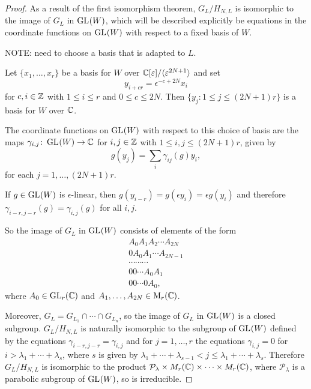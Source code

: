 \documentclass[a4paper, 11pt]{report}
\begin{document}
\begin{proof}
As a result of the first isomorphism theorem, $G_L/{H_{N,L}}$ is isomorphic to the image of $G_L$ in $\operatorname{GL}_{}(W)$, which will be described explicitly be equations in the coordinate functions on $\operatorname{GL}_{}(W)$ with respect to a fixed basis of $W$.

NOTE: need to choose a basis that is adapted to $L$.

Let $\{x_1,\ldots,x_r\}$ be a basis for $W$ over $\mathbb{C}[\varepsilon]/{\langle\varepsilon^{2N+1}\rangle}$ and set
\begin{equation*}
y_{i+cr} = \epsilon^{-c+2N} x_i
\end{equation*}
for $c,i\in\mathbb{Z}$ with $1\le i\le r$ and $0\le c\le 2N$. Then $\{y_j:1\le j\le (2N+1)r\}$ is a basis for $W$ over $\mathbb{C}$.

The coordinate functions on $\operatorname{GL}_{}(W)$ with respect to this choice of basis are
the maps $\gamma_{i,j}\colon\operatorname{GL}_{}(W)\to\mathbb{C}$ for $i,j\in\mathbb{Z}$ with $1\le i,j\le (2N+1)r$, given by
\begin{equation*}
g(y_j) = \sum_i \gamma_{ij}(g)y_i,
\end{equation*}
for each $j=1,\ldots,(2N+1)r$.

If $g\in\operatorname{GL}_{}(W)$ is $\epsilon$-linear, then $g(y_{i-r}) = g(\epsilon y_i) = \epsilon g(y_i)$ and therefore $\gamma_{i-r,j-r}(g) = \gamma_{i,j}(g)$ for all $i,j$.

So the image of $G_L$ in $\operatorname{GL}_{}(W)$ consists of elements of the form
\begin{align*}
A_0 A_1 A_2 \cdots A_{2N}\\
0 A_0 A_1 \cdots A_{2N-1}\\
\cdots \cdots \cdots\\
0 0 \cdots A_0 A_1\\
0 0 \cdots 0 A_0,
\end{align*}
where $A_0\in\operatorname{GL}_{r}(\mathbb{C})$ and $A_1,\ldots,A_{2N}\in\operatorname{M}_{r}(\mathbb{C})$.

{\color{gray}
Moreover, $G_L = G_{L_1}\cap\cdots\cap G_{L_n}$, so the image of $G_L$ in $\operatorname{GL}_{}(W)$ is a closed subgroup. $G_L/{H_{N,L}}$ is naturally isomorphic to the subgroup of $\operatorname{GL}_{}(W)$ defined by the equations $\gamma_{i-r,j-r} = \gamma_{i,j}$ and for $j=1,\ldots,r$ the equations $\gamma_{i,j}=0$ for $i>\lambda_1+\cdots +\lambda_s$, where $s$ is given by $\lambda_1+\cdots +\lambda_{s-1}< j\le\lambda_1+\cdots +\lambda_s$. Therefore $G_L/{H_{N,L}}$ is isomorphic to the product $\mathcal{P}_\lambda\times M_r(\mathbb{C})\times\cdots\times M_r(\mathbb{C})$, where $\mathcal{P}_\lambda$ is a parabolic subgroup of $\operatorname{GL}_{}(W)$, so is irreducible.}
\end{proof}
\end{document}

